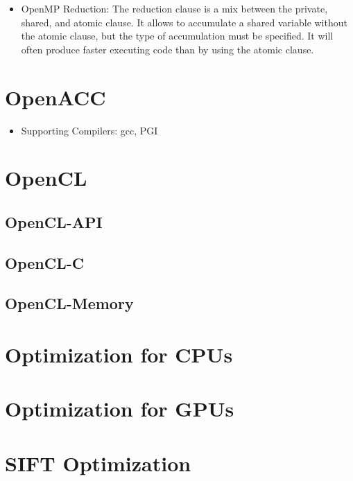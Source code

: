 \documentclass[paper=a4, fontsize=11pt]{scrartcl} %
\numberwithin{equation}{section} %
\numberwithin{figure}{section} %
\numberwithin{table}{section} %
\begin{document}
\begin{itemize}
  \item OpenMP Reduction: The reduction clause is a mix between the private, shared, and atomic clause. It allows to accumulate a shared variable without the atomic clause, but the type of accumulation must be specified. It will often produce faster executing code than by using the atomic clause.
\end{itemize}

\section{OpenACC}

\begin{itemize}
  \item Supporting Compilers: gcc, PGI
\end{itemize}

\section{OpenCL}

\subsection{OpenCL-API}

\subsection{OpenCL-C}

\subsection{OpenCL-Memory}

\section{Optimization for CPUs}

\section{Optimization for GPUs}

\section{SIFT Optimization}
\end{document}

